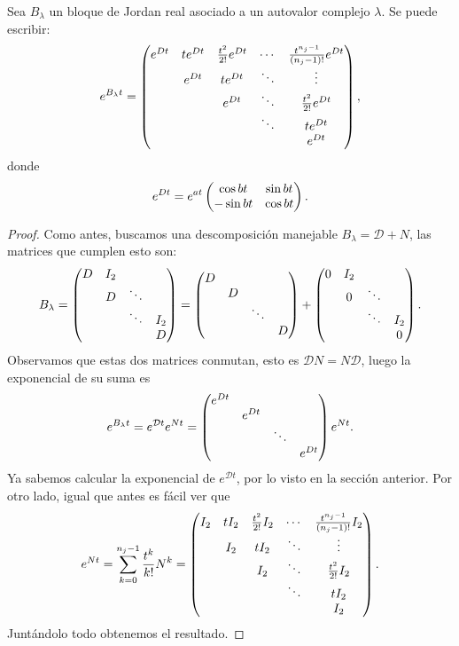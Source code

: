 \documentclass[../ecuaciones_diferenciales.tex]{subfiles}
\begin{document}
\begin{proposition}
	Sea \(B_\lambda\) un bloque de Jordan real asociado a un autovalor complejo 
	\(\lambda\). Se puede escribir:
	\[e^{B_\lambda t} = 
		\begin{pmatrix}e^{Dt} & te^{Dt} & \frac{t^2}{2!}e^{Dt} & \cdots & \frac{t^{n_j-1}}{(n_j-1)!}e^{Dt} \\
			& e^{Dt} & te^{Dt}                  & \ddots & \vdots                      \\
			&   & e^{Dt}                   & \ddots & \frac{t^2}{2!}e^{Dt}             \\
			&   &                     & \ddots & te^{Dt}                          \\
			&   &                     &        & e^{Dt}\end{pmatrix},\]
	donde
	\[e^{Dt} = e^{a t} \begin{pmatrix}\cos bt & \sin bt \\ -\sin bt & \cos bt\end{pmatrix}.\]
\end{proposition}

\begin{proof}
	Como antes, buscamos una descomposición manejable 
	\(B_\lambda = \mathcal{D} + N\), las matrices que cumplen esto son:
	\[B_\lambda = 
		\begin{pmatrix}D & I_2 & & \\ & D & \ddots & \\ & & \ddots & I_2 \\ & & & D\end{pmatrix} 
		= \begin{pmatrix}D & & & \\ & D & & \\ & & \ddots & \\ & & & D\end{pmatrix} +
		\begin{pmatrix}0 & I_2 & & \\ & 0 & \ddots & \\ & & \ddots & I_2 \\ & & & 0\end{pmatrix}.\]
	Observamos que estas dos matrices conmutan, esto es \(\mathcal{D}N =
	N\mathcal{D}\), luego la exponencial de su suma es
	\[e^{B_\lambda t} =
		e^{\mathcal{D}t} e^{Nt}
		= \begin{pmatrix}e^{Dt} & & & \\ & e^{Dt} & & \\ & & \ddots & \\ & & & e^{Dt}\end{pmatrix}
		e^{Nt}.\]
	Ya sabemos calcular la exponencial de \(e^{\mathcal{D}t}\), por lo visto en
	la sección anterior. Por otro lado, igual que antes es fácil ver que
	\[e^{Nt} = \sum_{k=0}^{n_j-1} \frac{t^k}{k!}N^k =
		\begin{pmatrix}I_2 & tI_2 & \frac{t^2}{2!}I_2 & \cdots & \frac{t^{n_j-1}}{(n_j-1)!}I_2 \\
			& I_2  & tI_2              & \ddots & \vdots                        \\
			&      & I_2               & \ddots & \frac{t^2}{2!}I_2             \\
			&      &                   & \ddots & tI_2                          \\
			&      &                   &        & I_2 \end{pmatrix}.\]
	Juntándolo todo obtenemos el resultado.
\end{proof}
\end{document}
